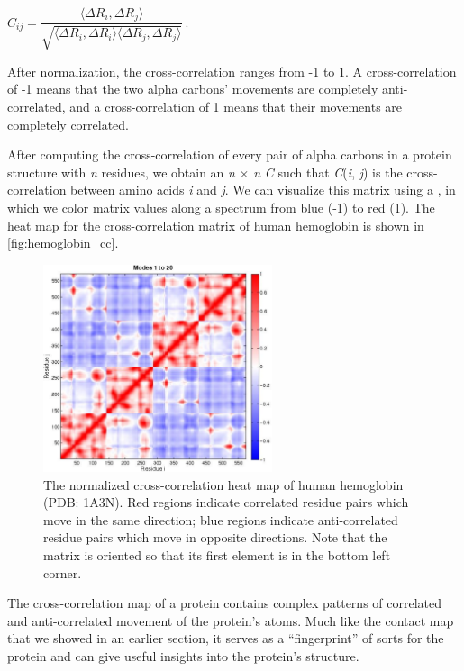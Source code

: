 \begin{center}
$ C_{ij} = \dfrac{\langle \Delta R_i, \Delta R_j \rangle}{\sqrt{\langle \Delta R_i, \Delta R_i \rangle \langle \Delta R_j, \Delta R_j \rangle}}\,. $
\end{center}

After normalization, the cross-correlation ranges from -1 to 1. A cross-correlation of -1 means that the two alpha carbons' movements are completely anti-correlated, and a cross-correlation of 1 means that their movements are completely correlated.

After computing the cross-correlation of every pair of alpha carbons in a protein structure with \textit{n} residues, we obtain an \textit{n} × \textit{n}  \textit{C} such that \textit{C}(\textit{i}, \textit{j}) is the cross-correlation between amino acids \textit{i} and \textit{j}. We can visualize this matrix using a , in which we color matrix values along a spectrum from blue (-1) to red (1). The heat map for the cross-correlation matrix of human hemoglobin is shown in \autoref{fig:hemoglobin_cc}.\\

\begin{figure}[h]
	\centering
	\mySfFamily
	\includegraphics[width = 0.6\textwidth]{../images/hemoglobin_cc.png}
	\caption{The normalized cross-correlation heat map of human hemoglobin (PDB: 1A3N). Red regions indicate correlated residue pairs which move in the same direction; blue regions indicate anti-correlated residue pairs which move in opposite directions. Note that the matrix is oriented so that its first element is in the bottom left corner.}
	\label{fig:hemoglobin_cc}
\end{figure}

The cross-correlation map of a protein contains complex patterns of correlated and anti-correlated movement of the protein's atoms. Much like the contact map that we showed in an earlier section, it serves as a ``fingerprint'' of sorts for the protein and can give useful insights into the protein's structure.

